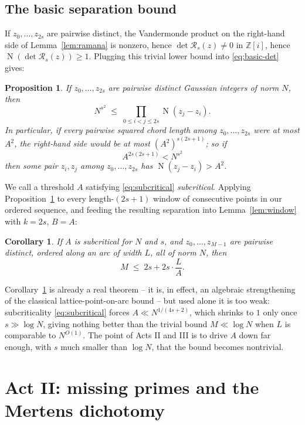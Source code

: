 \documentclass[11pt]{amsart}
\newtheorem{proposition}[theorem]{Proposition}
\newtheorem{corollary}[theorem]{Corollary}
\theoremstyle{definition}
\theoremstyle{remark}
\newcommand{\Z}{\mathbb{Z}}
\DeclareMathOperator{\Nm}{N}
\newcommand{\nm}[1]{\Nm(#1)}
\begin{document}
\subsection{The basic separation bound}

If $z_0,\dots,z_{2s}$ are pairwise distinct, the Vandermonde product on the right-hand side of Lemma~\ref{lem:ramana} is nonzero, hence $\det\mathcal{R}_s(z)\ne 0$ in $\Z[i]$, hence $\nm{\det \mathcal R_s(z)} \ge 1$. Plugging this trivial lower bound into \eqref{eq:basic-det} gives:

\begin{proposition}\label{prop:basic-sep}
If $z_0,\dots,z_{2s}$ are pairwise distinct Gaussian integers of norm $N$, then
\[
N^{s^2} \;\le\; \prod_{0\le i<j\le 2s} \nm{z_j-z_i}.
\]
In particular, if every pairwise squared chord length among $z_0,\dots,z_{2s}$ were at most $A^2$, the right-hand side would be at most $(A^2)^{s(2s+1)}$; so if
\begin{equation}\label{eq:subcritical}
A^{2s(2s+1)} < N^{s^2}
\end{equation}
then some pair $z_i,z_j$ among $z_0,\dots,z_{2s}$ has $\nm{z_j-z_i} > A^2$.
\end{proposition}

We call a threshold $A$ satisfying \eqref{eq:subcritical} \emph{subcritical}. Applying Proposition~\ref{prop:basic-sep} to every length-$(2s+1)$ window of consecutive points in our ordered sequence, and feeding the resulting separation into Lemma~\ref{lem:window} with $k=2s$, $B=A$:

\begin{corollary}\label{cor:basic-card}
If $A$ is subcritical for $N$ and $s$, and $z_0,\dots,z_{M-1}$ are pairwise distinct, ordered along an arc of width $L$, all of norm $N$, then
\[
M \;\le\; 2s + 2s\cdot \frac{L}{A}.
\]
\end{corollary}

Corollary~\ref{cor:basic-card} is already a real theorem -- it is, in effect, an algebraic strengthening of the classical lattice-point-on-arc bound -- but used alone it is too weak: subcriticality \eqref{eq:subcritical} forces $A \ll N^{1/(4s+2)}$, which shrinks to $1$ only once $s \gg \log N$, giving nothing better than the trivial bound $M \ll \log N$ when $L$ is comparable to $N^{O(1)}$. The point of Acts II and III is to drive $A$ down far enough, with $s$ much smaller than $\log N$, that the bound becomes nontrivial.

\section{Act II: missing primes and the Mertens dichotomy}\label{sec:act2}
\end{document}
